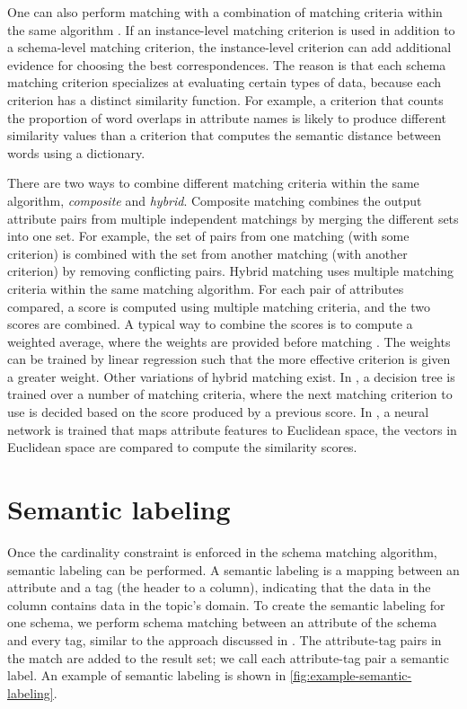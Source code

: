 One can also perform matching with a combination of matching criteria within the same algorithm \cite{Sorrentino2011NORMS}. If an instance-level matching criterion is used in addition to a schema-level matching criterion, the instance-level criterion can add additional evidence for choosing the best correspondences. The reason is that each schema matching criterion specializes at evaluating certain types of data, because each criterion has a distinct similarity function. For example, a criterion that counts the proportion of word overlaps in attribute names is likely to produce different similarity values than a criterion that computes the semantic distance between words using a dictionary.

There are two ways to combine different matching criteria within the same algorithm, \textit{composite} and \textit{hybrid}. Composite matching combines the output attribute pairs from multiple independent matchings by merging the different sets into one set. For example, the set of pairs from one matching (with some criterion) is combined with the set from another matching (with another criterion) by removing conflicting pairs. Hybrid matching uses multiple matching criteria within the same matching algorithm. For each pair of attributes compared, a score is computed using multiple matching criteria, and the two scores are combined. A typical way to combine the scores is to compute a weighted average, where the weights are provided before matching \cite{DBLP:journals/debu/ChenGHTD18}. The weights can be trained by linear regression \cite{Ehrig2004QOM} such that the more effective criterion is given a greater weight. Other variations of hybrid matching exist. In \cite{Giunchiglia2005Semantic}, a decision tree is trained over a number of matching criteria, where the next matching criterion to use is decided based on the score produced by a previous score. In \cite{Moawed2018Arabian}, a neural network is trained that maps attribute features to Euclidean space, the vectors in Euclidean space are compared to compute the similarity scores.

\section{Semantic labeling}
\label{sec:SemanticLabeling}

Once the cardinality constraint is enforced in the schema matching algorithm, semantic labeling can be performed. A semantic labeling is a mapping between an attribute and a tag (the header to a column), indicating that the data in the column contains data in the topic's domain. To create the semantic labeling for one schema, we perform schema matching between an attribute of the schema and every tag, similar to the approach discussed in \cite{Dong2012Proceedings,Salakhutdinov2009Semantic}. The attribute-tag pairs in the match are added to the result set; we call each attribute-tag pair a semantic label. An example of semantic labeling is shown in \autoref{fig:example-semantic-labeling}.

